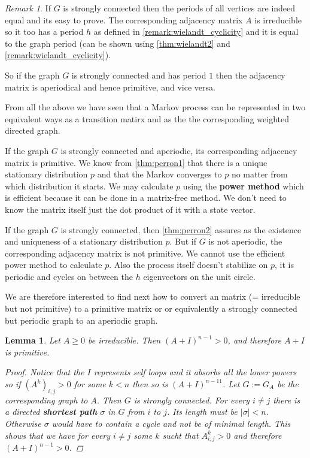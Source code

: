 \documentclass[a4paper,10pt]{article}
\newcommand{\gt}{>}
\newcommand{\lt}{<}
\theoremstyle{definition}
\theoremstyle{remark}
\newtheorem{remark}{Remark}
\theoremstyle{plain}
\newtheorem{lemma}{Lemma}[section]
\begin{document}
\begin{remark}
\label{remark:periods}
If $G$ is strongly connected then the periods of all vertices are indeed equal
and its easy to prove. The corresponding adjacency matrix $A$ is irreducible so
it too has a period $h$ as defined in \ref{remark:wielandt_cyclicity} and it is
equal to the graph period (can be shown using \ref{thm:wielandt2} and
\ref{remark:wielandt_cyclicity}).

So if the graph $G$ is strongly connected and has period $1$
then the adjacency matrix is aperiodical and hence primitive, and vice versa. 
\end{remark}

From all the above we have seen that a Markov process can be represented in two
equivalent ways \textemdash as a transition matirx  and as the the 
corresponding weighted directed graph.

If the graph $G$ is strongly connected and aperiodic, its corresponding
adjacency matrix is primitive. We know from \ref{thm:perron1} that there is a
unique stationary distribution $p$ and that the Markov converges to $p$ no
matter from which distribution it starts. We may calculate $p$ using the
\textbf{power
method} which is efficient because it can be done in a matrix-free method. 
We don't need to know the matrix itself just the dot product of it with a state
vector.

If the graph $G$ is strongly connected, then \ref{thm:perron2} assures as the
existence and uniqueness of a stationary distribution $p$. But if $G$ is not
aperiodic, the corresponding adjacency matrix is not primitive. We cannot use
the efficient power method to calculate $p$. Also the process itself doesn't
stabilize on $p$, it is periodic and cycles on between the $h$ eigenvectors on
the unit circle. 

We are therefore interested to find next how to convert an 
matrix (= irreducible but not primitive)
to a primitive matrix or or equivalently a strongly connected but periodic graph
to an aperiodic graph.

\begin{lemma}
\label{lem:1plusA}
Let $A \geq 0$ be irreducible. Then $(A + I)^{n-1} \gt 0$, and therefore $A+I$
is primitive.
\begin{proof}
Notice that the $I$ represents self loops and it absorbs all the lower powers so
if $(A^k)_{i,j} \gt 0$ for some $k \lt n$ then so is $(A+I)^{n-11}$.
Let $G := G_A$ be the corresponding graph to $A$. Then $G$ is strongly
connected. For every $i \neq j$ there is a directed \textbf{shortest path}
$\sigma$ in $G$ from $i$ to $j$. Its length must be $|\sigma| \lt n$. Otherwise
$\sigma$ would have to contain a cycle and not be of minimal length.
This shows that we have for every $i \neq j$ some $k$ sucht that $A^k_{i,j} \gt
0$ and therefore $(A+I)^{n-1} \gt 0$.
\end{proof}
\end{lemma}
\end{document}
